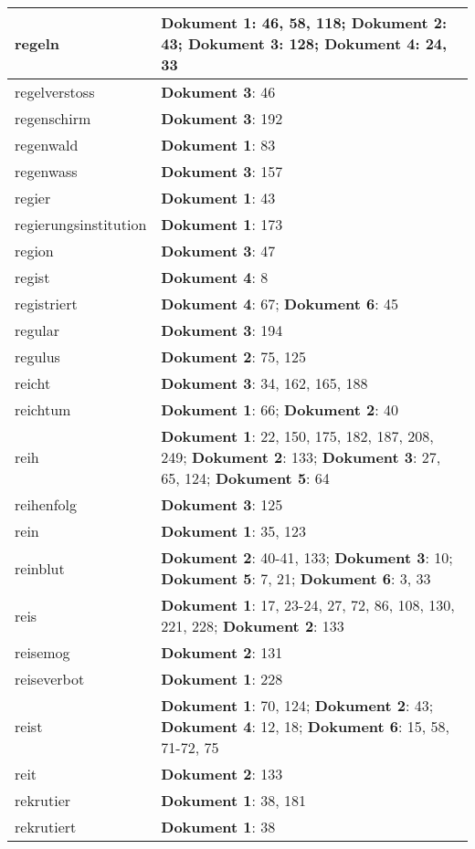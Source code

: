 \documentclass[a5paper]{article}
\begin{document}
\begin{longtable}[l]{|l|p{3in}|}
\hline
regeln & \textbf{Dokument 1}: 46, 58, 118; \textbf{Dokument 2}: 43; \textbf{Dokument 3}: 128; \textbf{Dokument 4}: 24, 33 \\
\hline
regelverstoss & \textbf{Dokument 3}: 46 \\
\hline
regenschirm & \textbf{Dokument 3}: 192 \\
\hline
regenwald & \textbf{Dokument 1}: 83 \\
\hline
regenwass & \textbf{Dokument 3}: 157 \\
\hline
regier & \textbf{Dokument 1}: 43 \\
\hline
regierungsinstitution & \textbf{Dokument 1}: 173 \\
\hline
region & \textbf{Dokument 3}: 47 \\
\hline
regist & \textbf{Dokument 4}: 8 \\
\hline
registriert & \textbf{Dokument 4}: 67; \textbf{Dokument 6}: 45 \\
\hline
regular & \textbf{Dokument 3}: 194 \\
\hline
regulus & \textbf{Dokument 2}: 75, 125 \\
\hline
reicht & \textbf{Dokument 3}: 34, 162, 165, 188 \\
\hline
reichtum & \textbf{Dokument 1}: 66; \textbf{Dokument 2}: 40 \\
\hline
reih & \textbf{Dokument 1}: 22, 150, 175, 182, 187, 208, 249; \textbf{Dokument 2}: 133; \textbf{Dokument 3}: 27, 65, 124; \textbf{Dokument 5}: 64 \\
\hline
reihenfolg & \textbf{Dokument 3}: 125 \\
\hline
rein & \textbf{Dokument 1}: 35, 123 \\
\hline
reinblut & \textbf{Dokument 2}: 40-41, 133; \textbf{Dokument 3}: 10; \textbf{Dokument 5}: 7, 21; \textbf{Dokument 6}: 3, 33 \\
\hline
reis & \textbf{Dokument 1}: 17, 23-24, 27, 72, 86, 108, 130, 221, 228; \textbf{Dokument 2}: 133 \\
\hline
reisemog & \textbf{Dokument 2}: 131 \\
\hline
reiseverbot & \textbf{Dokument 1}: 228 \\
\hline
reist & \textbf{Dokument 1}: 70, 124; \textbf{Dokument 2}: 43; \textbf{Dokument 4}: 12, 18; \textbf{Dokument 6}: 15, 58, 71-72, 75 \\
\hline
reit & \textbf{Dokument 2}: 133 \\
\hline
rekrutier & \textbf{Dokument 1}: 38, 181 \\
\hline
rekrutiert & \textbf{Dokument 1}: 38 \\

\end{longtable}
\end{document}
